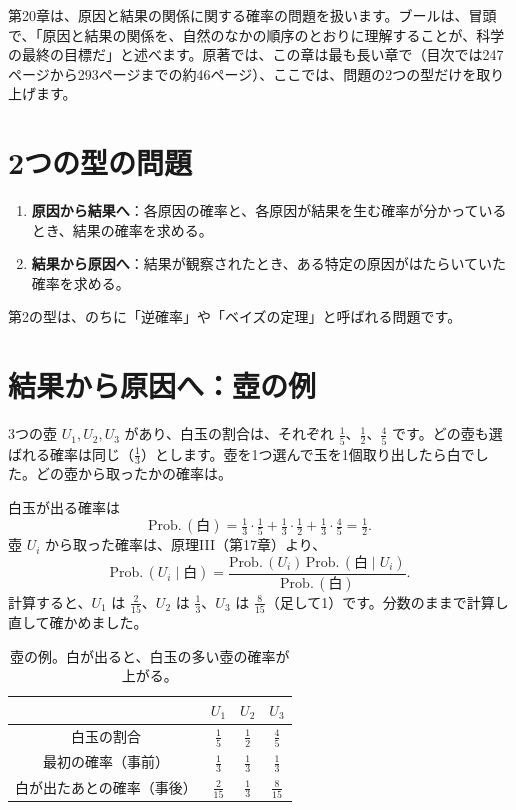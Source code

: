 \documentclass[a4paper,11pt,openany]{ltjsbook}
\newcommand{\Prob}{\mathrm{Prob.}\,}
\begin{document}
第20章は、原因と結果の関係に関する確率の問題を扱います。ブールは、冒頭で、「原因と結果の関係を、自然のなかの順序のとおりに理解することが、科学の最終の目標だ」と述べます。原著では、この章は最も長い章で（目次では247ページから293ページまでの約46ページ）、ここでは、問題の2つの型だけを取り上げます。

\section{2つの型の問題}

\begin{enumerate}[leftmargin=*]
\item \textbf{原因から結果へ}：各原因の確率と、各原因が結果を生む確率が分かっているとき、結果の確率を求める。
\item \textbf{結果から原因へ}：結果が観察されたとき、ある特定の原因がはたらいていた確率を求める。
\end{enumerate}

第2の型は、のちに「逆確率」や「ベイズの定理」と呼ばれる問題です。

\section{結果から原因へ：壺の例}

3つの壺 $U_1,U_2,U_3$ があり、白玉の割合は、それぞれ $\tfrac15$、$\tfrac12$、$\tfrac45$ です。どの壺も選ばれる確率は同じ（$\tfrac13$）とします。壺を1つ選んで玉を1個取り出したら白でした。どの壺から取ったかの確率は。

白玉が出る確率は
\[
\Prob(\text{白})=\tfrac13\cdot\tfrac15+\tfrac13\cdot\tfrac12+\tfrac13\cdot\tfrac45=\tfrac12 .
\]
壺 $U_i$ から取った確率は、原理III（第17章）より、
\[
\Prob(U_i\mid\text{白})=\frac{\Prob(U_i)\,\Prob(\text{白}\mid U_i)}{\Prob(\text{白})} .
\]
計算すると、$U_1$ は $\tfrac{2}{15}$、$U_2$ は $\tfrac13$、$U_3$ は $\tfrac{8}{15}$（足して1）です。分数のままで計算し直して確かめました。

\begin{table}[htbp]
\centering
\begin{tabular}{c|ccc}
\toprule
 & $U_1$ & $U_2$ & $U_3$\\
\midrule
白玉の割合 & $\tfrac15$ & $\tfrac12$ & $\tfrac45$\\
最初の確率（事前） & $\tfrac13$ & $\tfrac13$ & $\tfrac13$\\
白が出たあとの確率（事後） & $\tfrac2{15}$ & $\tfrac13$ & $\tfrac8{15}$\\
\bottomrule
\end{tabular}
\caption{壺の例。白が出ると、白玉の多い壺の確率が上がる。}
\end{table}
\end{document}
